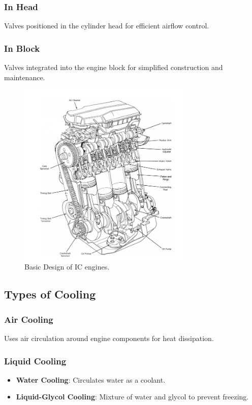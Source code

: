 \documentclass{article}
\begin{document}
\subsubsection*{In Head}
Valves positioned in the cylinder head for efficient airflow control.

\subsubsection*{In Block}
Valves integrated into the engine block for simplified construction and maintenance.

\begin{figure}[H]
  \centering
  \includegraphics[width=0.75\textwidth]{img/design.png}
  \caption{Basic Design of IC engines.}
  \label{fig:ic engine basic design}
\end{figure}

\subsection*{Types of Cooling}
\subsubsection*{Air Cooling}
Uses air circulation around engine components for heat dissipation.

\subsubsection*{Liquid Cooling}
\begin{itemize}
	\item \textbf{Water Cooling}: Circulates water as a coolant.
	\item \textbf{Liquid-Glycol Cooling}: Mixture of water and glycol to prevent freezing.
\end{itemize}
\end{document}
